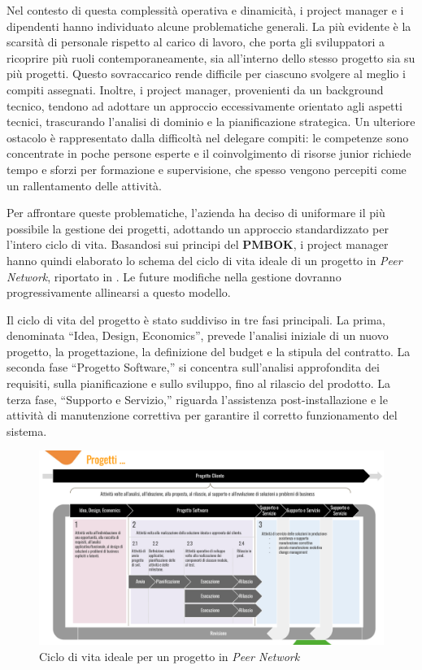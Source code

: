 Nel contesto di questa complessità operativa e dinamicità, i project manager e i dipendenti hanno individuato alcune problematiche generali.
La più evidente è la scarsità di personale rispetto al carico di lavoro, che porta gli sviluppatori a ricoprire più ruoli contemporaneamente,
sia all’interno dello stesso progetto sia su più progetti. Questo sovraccarico rende difficile per ciascuno svolgere al meglio i compiti assegnati.
Inoltre, i project manager, provenienti da un background tecnico, tendono ad adottare un approccio eccessivamente orientato agli aspetti tecnici,
trascurando l'analisi di dominio e la pianificazione strategica. Un ulteriore ostacolo è rappresentato dalla difficoltà nel delegare compiti: le
competenze sono concentrate in poche persone esperte e il coinvolgimento di risorse junior richiede tempo e sforzi per formazione e supervisione,
che spesso vengono percepiti come un rallentamento delle attività.

Per affrontare queste problematiche, l’azienda ha deciso di uniformare il più possibile la gestione dei progetti, adottando un approccio standardizzato
per l’intero ciclo di vita. Basandosi sui principi del \textbf{\ac{PMBOK}}\cite{project2021guide}, i project manager hanno quindi elaborato lo schema
del ciclo di vita ideale di un progetto in \textit{Peer Network}, riportato in . Le future modifiche nella gestione dovranno
progressivamente allinearsi a questo modello.

Il ciclo di vita del progetto è stato suddiviso in tre fasi principali. La prima, denominata “Idea, Design, Economics”, prevede l’analisi iniziale di un
nuovo progetto, la progettazione, la definizione del budget e la stipula del contratto. La seconda fase “Progetto Software,” si concentra sull’analisi
approfondita dei requisiti, sulla pianificazione e sullo sviluppo, fino al rilascio del prodotto. La terza fase, “Supporto e Servizio,” riguarda l’assistenza
post-installazione e le attività di manutenzione correttiva per garantire il corretto funzionamento del sistema.

\begin{figure}
    \centering
    \includegraphics[width=\linewidth]{figures/FasiProgettualiPN.pdf}
    \caption{Ciclo di vita ideale per un progetto in \textit{Peer Network}}
    \label{fig:fasi-progettuali}
\end{figure}

